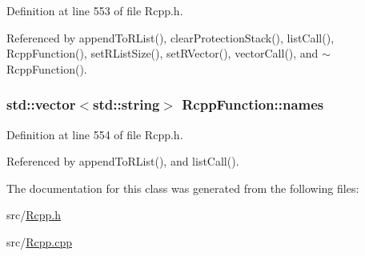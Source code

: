 Definition at line 553 of file Rcpp.h.

Referenced by appendToRList(), clearProtectionStack(), listCall(), RcppFunction(), setRListSize(), setRVector(), vectorCall(), and $\sim$RcppFunction().\hypertarget{classRcppFunction_bf9e86df5e1a290a5f321e6051f0d2b2}{
\subsubsection[names]{\setlength{\rightskip}{0pt plus 5cm}std::vector$<$std::string$>$ {\bf RcppFunction::names}}}
\label{classRcppFunction_bf9e86df5e1a290a5f321e6051f0d2b2}




Definition at line 554 of file Rcpp.h.

Referenced by appendToRList(), and listCall().

The documentation for this class was generated from the following files:\begin{CompactItemize}
\item 
src/\hyperlink{Rcpp_8h}{Rcpp.h}\item 
src/\hyperlink{Rcpp_8cpp}{Rcpp.cpp}\end{CompactItemize}
